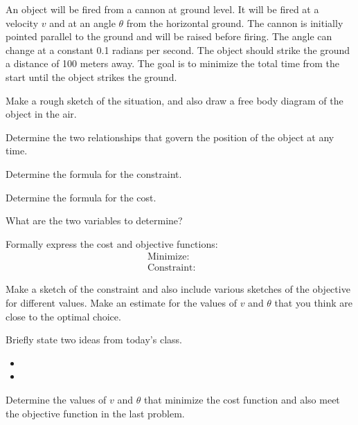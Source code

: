 \begin{problem}
\item An object will be fired from a cannon at ground level. It will
  be fired at a velocity $v$ and at an angle $\theta$ from the
  horizontal ground. The cannon is initially pointed parallel to the
  ground and will be raised before firing. The angle can change at a
  constant 0.1 radians per second. The object should strike the ground
  a distance of 100 meters away. The goal is to minimize the total
  time from the start until the object strikes the ground.
  \begin{subproblem}
  \item Make a rough sketch of the situation, and also draw a free
    body diagram of the object in the air.
    \vfill
  \item Determine the two relationships that govern the position of
    the object at any time.
    \vfill
  \item Determine the formula for the constraint.
    \vfill
  \item Determine the formula for the cost.
    \vfill

    \clearpage

  \item What are the two variables to determine?
    \vspace{2em}

  \item Formally express the cost and objective functions:
    \begin{eqnarray*}
      \mathrm{Minimize:} & &  \\
      \mathrm{Constraint:} & & 
    \end{eqnarray*}


  \item Make a sketch of the constraint and also include various
    sketches of the objective for different values. Make an estimate
    for the values of $v$ and $\theta$ that you think are close to the
    optimal choice.

    \vfill

  \item 

  \end{subproblem}

\end{problem}

\postClass

\begin{problem}
\item Briefly state two ideas from today's class.
  \begin{itemize}
  \item 
  \item 
  \end{itemize}
\item Determine the values of $v$ and $\theta$ that minimize the cost
  function and also meet the objective function in the last problem.
  \vfill
\end{problem}



